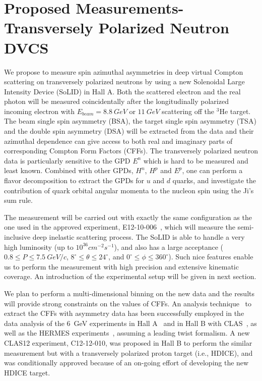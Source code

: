 \section{Proposed Measurements-Transversely Polarized Neutron DVCS}
We propose to measure spin azimuthal asymmetries in deep virtual Compton scattering on transversely polarized neutrons by using a new Solenoidal Large Intensity Device (SoLID) in Hall A. Both the scattered electron and the real photon will be measured coincidentally after the longitudinally polarized incoming electron with $E_{beam}=8.8~GeV$ or $11~GeV$ scattering off the $\mathrm{^{3}He}$ target. The beam single spin asymmetry (BSA), the target single spin asymmetry (TSA) and the double spin asymmetry (DSA) will be extracted from the data and their azimuthal dependence can give access to both real and imaginary parts of corresponding Compton Form Factors (CFFs). %
The transversely polarized neutron data is particularly sensitive to the GPD $E^{n}$ which is hard to be measured and least known. Combined with other GPDs, $H^{n}$, $H^{p}$ and $E^{p}$, one can perform a flavor decomposition to extract the GPDs for $u$ and $d$ quarks, and investigate the contribution of quark orbital angular momenta to the nucleon spin using the Ji's sum rule.

The measurement will be carried out with exactly the same configuration as the one used in the approved experiment, E12-10-006~\cite{e12-10-006}, which will measure the semi-inclusive deep inelastic scattering process. The SoLID is able to handle a very high luminosity (up to $10^{36} cm^{-2}s^{-1}$), and also has a large acceptance ($0.8\leq P \leq 7.5~GeV/c$, $8^{\circ}\leq \theta \leq 24^{\circ}$, and $0^{\circ}\leq \phi \leq 360^{\circ}$). Such nice features enable us to perform the measurement with high precision and extensive kinematic coverage. An introduction of the experimental setup will be given in next section.

We plan to perform a multi-dimensional binning on the new data and the results will provide strong constraints on the values of CFFs. An analysis technique~\cite{Gui03} to extract the CFFs with asymmetry data has been successfully employed in the data analysis of the 6~GeV experiments in Hall A~\cite{MunozCamacho:2006hx} and in Hall B with CLAS~\cite{PhysRevLett.100.162002}, as well as the HERMES experiments~\cite{Airapetian:2001yk, Airapetian:2012mq, Airapetian:2010ab, Airapetian:2008aa, Airapetian:2011uq, Airapetian:2006zr, Airapetian:2009aa, Airapetian:2009bi}, assuming a leading twist formalism. A new CLAS12 experiment, C12-12-010, was proposed in Hall B to perform the similar measurement but with a transversely polarized proton target (i.e., HDICE), and was conditionally approved because of an on-going effort of developing the new HDICE target.%
